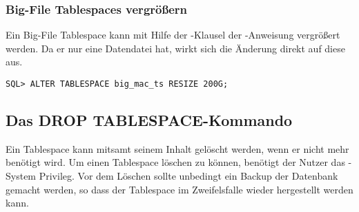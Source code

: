         \subsubsection{Big-File Tablespaces vergr\"o\ss{}ern}
          Ein Big-File Tablespace kann mit Hilfe der -Klausel der -An\-wei\-sung vergr\"o\ss{}ert werden. Da er nur eine Datendatei hat, wirkt sich die \"Anderung direkt auf diese aus.
          \begin{lstlisting}[caption={Einen Big-File Tablespace vergr\"o\ss{}ern},label=admin117,language=oracle_sql]
SQL> ALTER TABLESPACE big_mac_ts RESIZE 200G;
          \end{lstlisting}
      \subsection{Das DROP TABLESPACE-Kommando}
          Ein Tablespace kann mitsamt seinem Inhalt gel\"oscht werden, wenn er nicht mehr ben\"otigt wird. Um einen Tablespace l\"oschen zu k\"onnen, ben\"otigt der Nutzer das -System Privileg. Vor dem L\"oschen sollte unbedingt ein Backup der Datenbank gemacht werden, so dass der Tablespace im Zweifelsfalle wieder hergestellt werden kann.

